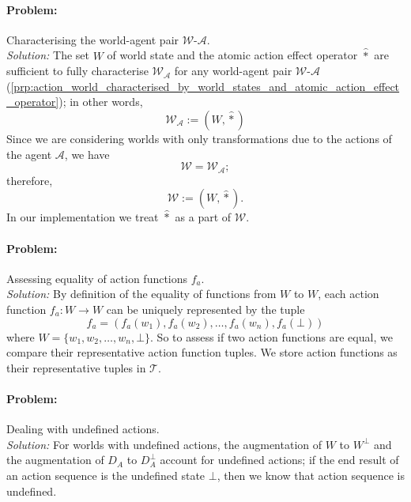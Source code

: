 \paragraph{Problem:}
Characterising the world-agent pair $\mathscr{W}$-$\mathscr{A}$.
\\\textit{Solution:}
The set $W$ of world state and the atomic action effect operator $\hat{\ast}$ are sufficient to fully characterise $\mathscr{W}_{\mathscr{A}}$ for any world-agent pair $\mathscr{W}$-$\mathscr{A}$ (\cref{prp:action_world_characterised_by_world_states_and_atomic_action_effect_operator}); in other words,
\begin{equation}
    \mathscr{W}_{\mathscr{A}} := (W, \hat{\ast})
\end{equation}
Since we are considering worlds with only transformations due to the actions of the agent $\mathscr{A}$, we have
\begin{equation}
    \mathscr{W} = \mathscr{W}_{\mathscr{A}};
\end{equation}
therefore,
\begin{equation}
    \mathscr{W} := (W, \hat{\ast}).
\end{equation}
In our implementation we treat $\hat{*}$ as a part of $\mathscr{W}$.


\paragraph{Problem:}
Assessing equality of action functions $f_{a}$.
\\\textit{Solution:}
By definition of the equality of functions from $W$ to $W$, each action function $f_{a}: W \to W$ can be uniquely represented by the tuple
\begin{equation}
    f_{a} = (f_{a}(w_{1}), f_{a}(w_{2}), \dots, f_{a}(w_{n}), f_{a}(\bot))
\end{equation}
where $W = \{ w_{1}, w_{2}, \dots, w_{n}, \bot\}$.
So to assess if two action functions are equal, we compare their representative action function tuples.
We store action functions as their representative tuples in $\mathcal{T}$.


\paragraph{Problem:}
Dealing with undefined actions.
\\\textit{Solution:}
For worlds with undefined actions, the augmentation of $W$ to $W^{\bot}$ and the augmentation of $D_{A}$ to $D_{A}^{\bot}$ account for undefined actions; if the end result of an action sequence is the undefined state $\bot$, then we know that action sequence is undefined.


